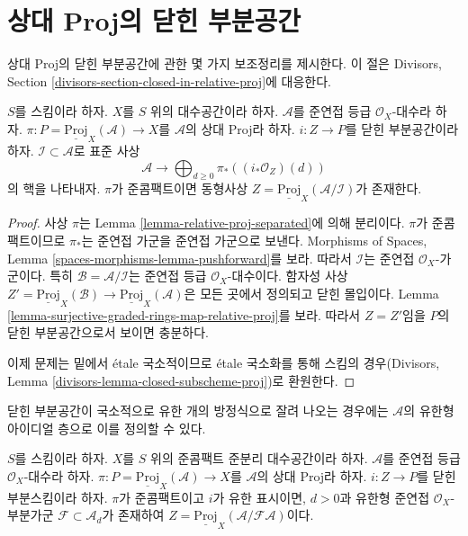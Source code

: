 \section{상대 Proj의 닫힌 부분공간}
\label{section-closed-in-relative-proj}

\noindent
상대 Proj의 닫힌 부분공간에 관한 몇 가지 보조정리를 제시한다.
이 절은 Divisors, Section
\ref{divisors-section-closed-in-relative-proj}에 대응한다.

\begin{lemma}
\label{lemma-closed-subscheme-proj}
$S$를 스킴이라 하자. $X$를 $S$ 위의 대수공간이라 하자.
$\mathcal{A}$를 준연접 등급 $\mathcal{O}_X$-대수라 하자.
$\pi : P = \underline{\text{Proj}}_X(\mathcal{A}) \to X$를
$\mathcal{A}$의 상대 Proj라 하자. $i : Z \to P$를 닫힌 부분공간이라
하자. $\mathcal{I} \subset \mathcal{A}$로 표준 사상
$$
\mathcal{A}
\longrightarrow
\bigoplus\nolimits_{d \geq 0} \pi_*\left((i_*\mathcal{O}_Z)(d)\right)
$$
의 핵을 나타내자.
$\pi$가 준콤팩트이면 동형사상
$Z = \underline{\text{Proj}}_X(\mathcal{A}/\mathcal{I})$가 존재한다.
\end{lemma}

\begin{proof}
사상 $\pi$는 Lemma \ref{lemma-relative-proj-separated}에 의해 분리이다.
$\pi$가 준콤팩트이므로 $\pi_*$는 준연접 가군을 준연접 가군으로 보낸다.
Morphisms of Spaces, Lemma
\ref{spaces-morphisms-lemma-pushforward}를 보라. 따라서 $\mathcal{I}$는
준연접 $\mathcal{O}_X$-가군이다. 특히
$\mathcal{B} = \mathcal{A}/\mathcal{I}$는 준연접 등급
$\mathcal{O}_X$-대수이다. 함자성 사상
$Z' = \underline{\text{Proj}}_X(\mathcal{B}) \to
\underline{\text{Proj}}_X(\mathcal{A})$은 모든 곳에서 정의되고 닫힌
몰입이다. Lemma
\ref{lemma-surjective-graded-rings-map-relative-proj}를 보라. 따라서
$Z = Z'$임을 $P$의 닫힌 부분공간으로서 보이면 충분하다.

\medskip\noindent
이제 문제는 밑에서 \'etale 국소적이므로 \'etale 국소화를 통해
스킴의 경우(Divisors, Lemma
\ref{divisors-lemma-closed-subscheme-proj})로 환원한다.
\end{proof}

\noindent
닫힌 부분공간이 국소적으로 유한 개의 방정식으로 잘려 나오는 경우에는
$\mathcal{A}$의 유한형 아이디얼 층으로 이를 정의할 수 있다.

\begin{lemma}
\label{lemma-closed-subscheme-proj-finite}
$S$를 스킴이라 하자. $X$를 $S$ 위의 준콤팩트 준분리 대수공간이라
하자. $\mathcal{A}$를 준연접 등급 $\mathcal{O}_X$-대수라 하자.
$\pi : P = \underline{\text{Proj}}_X(\mathcal{A}) \to X$를
$\mathcal{A}$의 상대 Proj라 하자. $i : Z \to P$를 닫힌 부분스킴이라
하자. $\pi$가 준콤팩트이고
$i$가 유한 표시이면, $d > 0$과 유한형 준연접
$\mathcal{O}_X$-부분가군 $\mathcal{F} \subset \mathcal{A}_d$가 존재하여
$Z = \underline{\text{Proj}}_X(\mathcal{A}/\mathcal{F}\mathcal{A})$이다.
\end{lemma}

